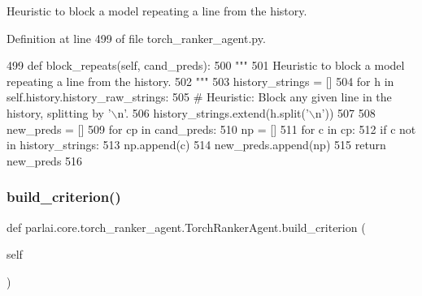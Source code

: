 \begin{DoxyVerb}Heuristic to block a model repeating a line from the history.
\end{DoxyVerb}
 

Definition at line 499 of file torch\+\_\+ranker\+\_\+agent.\+py.


\begin{DoxyCode}
499     \textcolor{keyword}{def }block\_repeats(self, cand\_preds):
500         \textcolor{stringliteral}{"""}
501 \textcolor{stringliteral}{        Heuristic to block a model repeating a line from the history.}
502 \textcolor{stringliteral}{        """}
503         history\_strings = []
504         \textcolor{keywordflow}{for} h \textcolor{keywordflow}{in} self.history.history\_raw\_strings:
505             \textcolor{comment}{# Heuristic: Block any given line in the history, splitting by '\(\backslash\)n'.}
506             history\_strings.extend(h.split(\textcolor{stringliteral}{'\(\backslash\)n'}))
507 
508         new\_preds = []
509         \textcolor{keywordflow}{for} cp \textcolor{keywordflow}{in} cand\_preds:
510             np = []
511             \textcolor{keywordflow}{for} c \textcolor{keywordflow}{in} cp:
512                 \textcolor{keywordflow}{if} c \textcolor{keywordflow}{not} \textcolor{keywordflow}{in} history\_strings:
513                     np.append(c)
514             new\_preds.append(np)
515         \textcolor{keywordflow}{return} new\_preds
516 
\end{DoxyCode}
\mbox{\label{classparlai_1_1core_1_1torch__ranker__agent_1_1TorchRankerAgent_a16d004a75c5fee42cd13db4abe157b98}} 
\subsubsection{\texorpdfstring{build\+\_\+criterion()}{build\_criterion()}}
{\footnotesize\ttfamily def parlai.\+core.\+torch\+\_\+ranker\+\_\+agent.\+Torch\+Ranker\+Agent.\+build\+\_\+criterion (\begin{DoxyParamCaption}\item[{}]{self }\end{DoxyParamCaption})}

